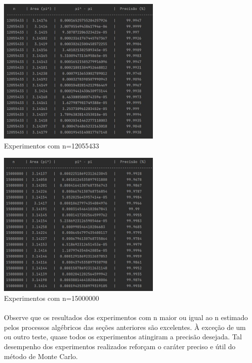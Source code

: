 \documentclass{article}
\begin{document}
    \begin{center}
        \includegraphics[width=0.6\textwidth]{experimento_final1}\\
        \caption{Experimentos com n=12055433}

        \includegraphics[width=0.6\textwidth]{experimento_final2}\\
        \caption{Experimentos com n=15000000}
    \end{center}

    \paragraph{} Observe que os resultados dos experimentos com n maior ou igual ao n estimado pelos processos algébricos das seções anteriores são excelentes. À exceção de um ou outro teste, quase todos os experimentos atingiram a precisão desejada. Tal desempenho dos experimentos realizados reforçam o caráter preciso e útil do método de Monte Carlo.
\end{document}
